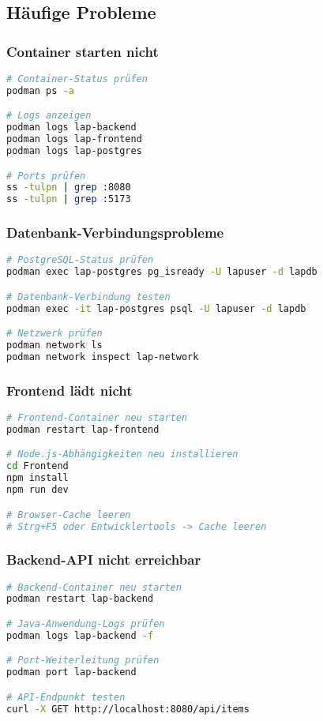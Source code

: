 \documentclass[a4paper,12pt]{article}
\begin{document}
\subsection{Häufige Probleme}

\subsubsection{Container starten nicht}
\begin{lstlisting}[language=bash]
# Container-Status prüfen
podman ps -a

# Logs anzeigen
podman logs lap-backend
podman logs lap-frontend
podman logs lap-postgres

# Ports prüfen
ss -tulpn | grep :8080
ss -tulpn | grep :5173
\end{lstlisting}

\subsubsection{Datenbank-Verbindungsprobleme}
\begin{lstlisting}[language=bash]
# PostgreSQL-Status prüfen
podman exec lap-postgres pg_isready -U lapuser -d lapdb

# Datenbank-Verbindung testen
podman exec -it lap-postgres psql -U lapuser -d lapdb

# Netzwerk prüfen
podman network ls
podman network inspect lap-network
\end{lstlisting}

\subsubsection{Frontend lädt nicht}
\begin{lstlisting}[language=bash]
# Frontend-Container neu starten
podman restart lap-frontend

# Node.js-Abhängigkeiten neu installieren
cd Frontend
npm install
npm run dev

# Browser-Cache leeren
# Strg+F5 oder Entwicklertools -> Cache leeren
\end{lstlisting}

\subsubsection{Backend-API nicht erreichbar}
\begin{lstlisting}[language=bash]
# Backend-Container neu starten
podman restart lap-backend

# Java-Anwendung-Logs prüfen
podman logs lap-backend -f

# Port-Weiterleitung prüfen
podman port lap-backend

# API-Endpunkt testen
curl -X GET http://localhost:8080/api/items
\end{lstlisting}
\end{document}

